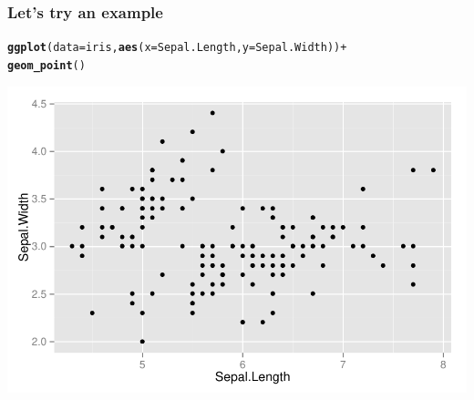\documentclass{beamer}\usepackage[]{graphicx}\usepackage[]{color}
\makeatletter
\newcommand{\hlopt}[1]{\textcolor[rgb]{0,0,0}{#1}}%
\newcommand{\hlstd}[1]{\textcolor[rgb]{0.345,0.345,0.345}{#1}}%
\newcommand{\hlkwc}[1]{\textcolor[rgb]{0.333,0.667,0.333}{#1}}%
\newcommand{\hlkwd}[1]{\textcolor[rgb]{0.737,0.353,0.396}{\textbf{#1}}}%
\newenvironment{kframe}{%
 \def\at@end@of@kframe{}%
 \ifinner\ifhmode%
  \def\at@end@of@kframe{\end{minipage}}%
  \begin{minipage}{\columnwidth}%
 \fi\fi%
 \def\FrameCommand##1{\hskip\@totalleftmargin \hskip-\fboxsep
 \colorbox{shadecolor}{##1}\hskip-\fboxsep
     \hskip-\linewidth \hskip-\@totalleftmargin \hskip\columnwidth}%
 \MakeFramed {\advance\hsize-\width
   \@totalleftmargin\z@ \linewidth\hsize
   \@setminipage}}%
 {\par\unskip\endMakeFramed%
 \at@end@of@kframe}
\newenvironment{knitrout}{}{} %
\makeatother
\begin{document}
\begin{frame}[fragile]
\frametitle{Let's try an example}
\begin{knitrout}\footnotesize
{}\color{fgcolor}\begin{kframe}
\begin{alltt}
\hlkwd{ggplot}\hlstd{(}\hlkwc{data} \hlstd{= iris,} \hlkwd{aes}\hlstd{(}\hlkwc{x} \hlstd{= Sepal.Length,} \hlkwc{y} \hlstd{= Sepal.Width))} \hlopt{+}
\hlkwd{geom_point}\hlstd{()}
\end{alltt}
\end{kframe}

{\centering \includegraphics[width=.75\linewidth]{figure/first_plot_} 

}



\end{knitrout}

\end{frame}

\end{document}
